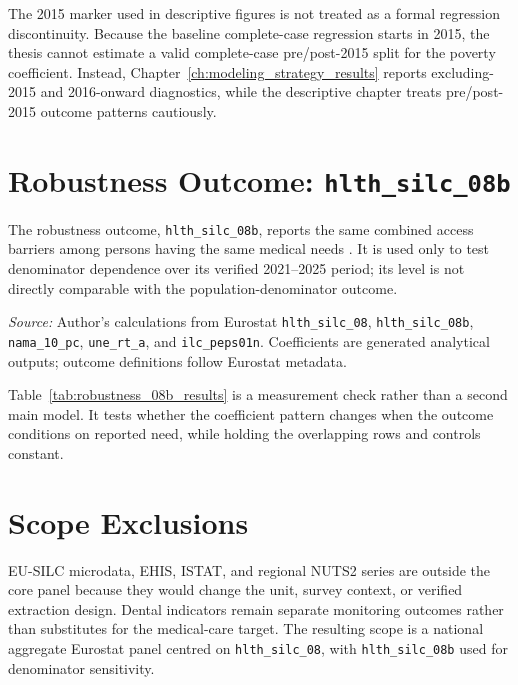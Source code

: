 The 2015 marker used in descriptive figures is not treated as a formal regression discontinuity. Because the baseline complete-case regression starts in 2015, the thesis cannot estimate a valid complete-case pre/post-2015 split for the poverty coefficient. Instead, Chapter~\ref{ch:modeling_strategy_results} reports excluding-2015 and 2016-onward diagnostics, while the descriptive chapter treats pre/post-2015 outcome patterns cautiously.

\section{Robustness Outcome: \texttt{hlth\_silc\_08b}}

The robustness outcome, \texttt{hlth\_silc\_08b}, reports the same combined access barriers among persons having the same medical needs \citep{eurostat_health_variables_metadata,eurostat_unmet_needs_statistics}. It is used only to test denominator dependence over its verified 2021--2025 period; its level is not directly comparable with the population-denominator outcome.

\begin{table}[htbp]
\centering
\caption{Population- and need-denominator regression comparison. The table uses overlapping 2021--2025 country-year cells with complete values for the three shared controls and diagnoses denominator sensitivity.}
\label{tab:robustness_08b_results}

\vspace{0.25em}

\begin{minipage}{0.9\textwidth}
\scriptsize \textit{Source:} Author's calculations from Eurostat \texttt{hlth\_silc\_08}, \texttt{hlth\_silc\_08b}, \texttt{nama\_10\_pc}, \texttt{une\_rt\_a}, and \texttt{ilc\_peps01n}. Coefficients are generated analytical outputs; outcome definitions follow Eurostat metadata.
\end{minipage}
\end{table}

Table~\ref{tab:robustness_08b_results} is a measurement check rather than a second main model. It tests whether the coefficient pattern changes when the outcome conditions on reported need, while holding the overlapping rows and controls constant.

\section{Scope Exclusions}

EU-SILC microdata, EHIS, ISTAT, and regional NUTS2 series are outside the core panel because they would change the unit, survey context, or verified extraction design. Dental indicators remain separate monitoring outcomes rather than substitutes for the medical-care target. The resulting scope is a national aggregate Eurostat panel centred on \texttt{hlth\_silc\_08}, with \texttt{hlth\_silc\_08b} used for denominator sensitivity.
